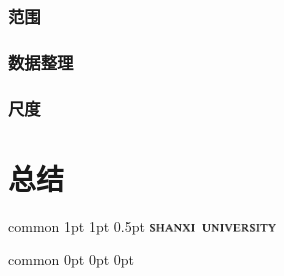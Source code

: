 \documentclass[
    report,     %
    oneside,    %
    UTF8,       %
    zihao=-4    %
]{config} %
\begin{document}
\subsection{范围}
\subsection{数据整理}
\subsection{尺度}
\chapter{总结}









\Header
    {common} %
    {1pt} %
    {1pt} %
    {0.5pt} %
    {} %
    {\includegraphics[width=0.25\textwidth]{figures/logos/SXU-title-EN.png}} %
    {} %


\Footer
    {common} %
    {0pt} %
    {0pt} %
    {0pt} %
    {} %
    {\thepage} %
    {} %





\end{document}
